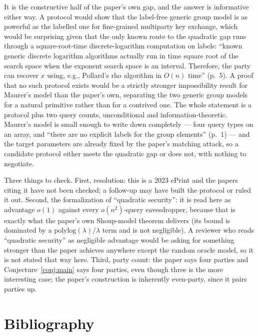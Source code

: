\documentclass{aicr-conjecture}
\newcommand{\polylog}{\mathrm{polylog}}
\begin{document}
\begin{remark}\label{rem:why}
It is the constructive half of the paper's own gap, and the answer is
informative either way. A protocol would show that the label-free
generic group model is as powerful as the labelled one for fine-grained
multiparty key exchange, which would be surprising given that the only
known route to the quadratic gap runs through a square-root-time
discrete-logarithm computation on labels: ``known generic discrete
logarithm algorithms actually run in time square root of the search
space when the exponent search space is an interval. Therefore, the
party can recover $x$ using, e.g., Pollard's rho algorithm in $O(n)$
time'' (p.~5). A proof that no such protocol exists would be a strictly
stronger impossibility result for Maurer's model than the paper's own,
separating the two generic group models for a natural primitive rather
than for a contrived one. The whole statement is a protocol plus two
query counts, unconditional and information-theoretic. Maurer's model is
small enough to write down completely --- four query types on an array,
and ``there are no explicit labels for the group elements'' (p.~1) ---
and the target parameters are already fixed by the paper's matching
attack, so a candidate protocol either meets the quadratic gap or does
not, with nothing to negotiate.
\end{remark}

\begin{remark}\label{rem:caveats}
Three things to check. First, resolution: this is a 2023 ePrint and the
papers citing it have not been checked; a follow-up may have built the
protocol or ruled it out. Second, the formalization of ``quadratic
security'': it is read here as advantage $o(1)$ against every
$o(n^{2})$-query eavesdropper, because that is exactly what the paper's
own Shoup-model theorem delivers (its bound is dominated by a
$\polylog(\lambda)/\lambda$ term and is not negligible). A reviewer who
reads ``quadratic security'' as negligible advantage would be asking for
something stronger than the paper achieves anywhere except the random
oracle model, so it is not stated that way here. Third, party count: the
paper says four parties and Conjecture~\ref{conj:main} says four
parties, even though three is the more interesting case; the paper's
construction is inherently even-party, since it pairs parties up.
\end{remark}

\section{Bibliography}
\end{document}

